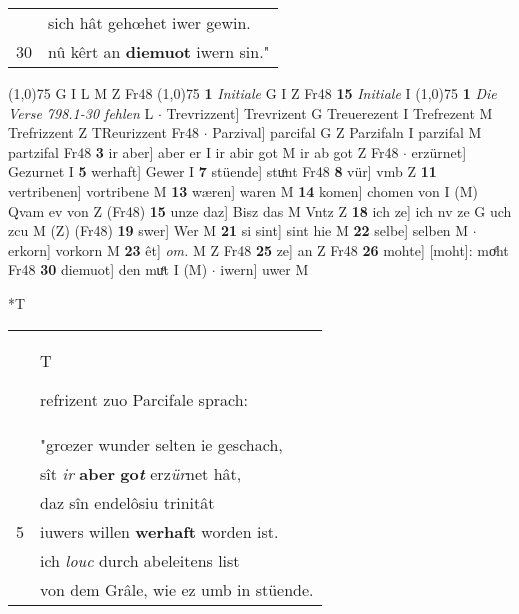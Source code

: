 \documentclass[8pt,a4paper,notitlepage]{article}
\begin{document}
\begin{table}[ht]
\begin{minipage}[t]{0.5\linewidth}
\begin{tabular}{rl}
 & sich hât gehœhet iwer gewin.\\ 
30 & nû kêrt an \textbf{diemuot} iwern sin."\\ 
\end{tabular}
\scriptsize
\line(1,0){75} \newline
G I L M Z Fr48 \newline
\line(1,0){75} \newline
\textbf{1} \textit{Initiale} G I Z Fr48  \textbf{15} \textit{Initiale} I  \newline
\line(1,0){75} \newline
\textbf{1} \textit{Die Verse 798.1-30 fehlen} L   $\cdot$ Trevrizzent] Trevrizent G Treuerezent I Trefrezent M Trefrizzent Z TReurizzent Fr48  $\cdot$ Parzival] parcifal G Z Parzifaln I parzifal M partzifal Fr48 \textbf{3} ir aber] aber er I ir abir got M ir ab got Z Fr48  $\cdot$ erzürnet] Gezurnet I \textbf{5} werhaft] Gewer I \textbf{7} stüende] stuͦnt Fr48 \textbf{8} vür] vmb Z \textbf{11} vertribenen] vortribene M \textbf{13} wæren] waren M \textbf{14} komen] chomen von I (M) Qvam ev von Z (Fr48) \textbf{15} unze daz] Bisz das M Vntz Z \textbf{18} ich ze] ich nv ze G uch zcu M (Z) (Fr48) \textbf{19} swer] Wer M \textbf{21} si sint] sint hie M \textbf{22} selbe] selben M  $\cdot$ erkorn] vorkorn M \textbf{23} êt] \textit{om.} M Z Fr48 \textbf{25} ze] an Z Fr48 \textbf{26} mohte] [moht]: moͤht Fr48 \textbf{30} diemuot] den muͤt I (M)  $\cdot$ iwern] uwer M \newline
\end{minipage}
\hspace{0.5cm}
\begin{minipage}[t]{0.5\linewidth}
\small
\begin{center}*T
\end{center}
\begin{tabular}{rl}
 & \begin{large}T\end{large}refrizent zuo Parcifale sprach:\\ 
 & "grœzer wunder selten ie geschach,\\ 
 & sît \textit{ir} \textbf{aber} \textbf{go\textit{t}} erz\textit{ür}net hât,\\ 
 & daz sîn endelôsiu trinitât\\ 
5 & iuwers willen \textbf{werhaft} worden ist.\\ 
 & ich \textit{louc} durch abeleitens list\\ 
 & von dem Grâle, wie ez umb in stüende.\\ 

\end{tabular}
\end{minipage}
\end{table}
\end{document}
